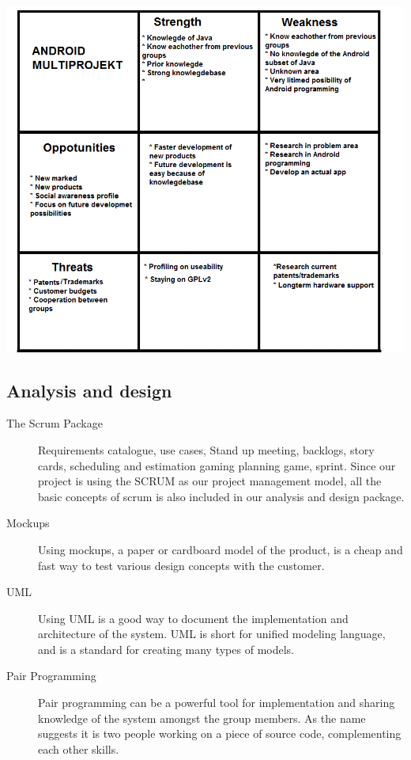 \includegraphics[scale=0.60]{SWOT.png}

\subsection*{Analysis and design}
\begin{description}
 \item[The Scrum Package] Requirements catalogue, use cases, Stand up meeting, backlogs, story cards, scheduling and estimation gaming planning game, sprint.
       Since our project is using the SCRUM as our project management model, all the basic concepts of scrum is also included in our analysis and design package.
 \item[Mockups] Using mockups, a paper or cardboard model of the product, is a cheap and fast way to test various design concepts with the customer.
 \item[UML] Using UML is a good way to document the implementation and architecture of the system. UML is short for unified modeling language, and is a standard for creating many types of models.
 \item[Pair Programming] Pair programming can be a powerful tool for implementation and sharing knowledge of the system amongst the group members. As the name suggests it is two people working on a piece of source code, complementing each other skills.
\end{description}

